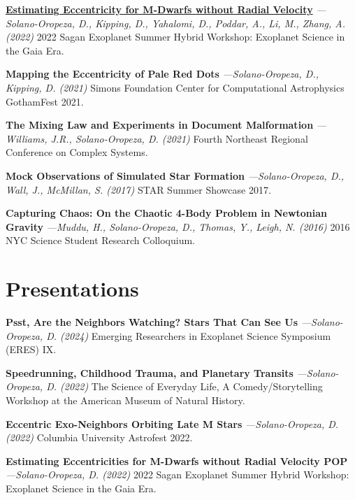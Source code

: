 \documentclass[a4paper,11pt]{article}
\begin{document}
    {\href{https://nexsci.caltech.edu/workshop/2022/posters/finalmaybe_sagan22_eccentricity_poster.pdf}{\textbf{Estimating Eccentricity for M-Dwarfs without Radial Velocity}}} \textit{—Solano-Oropeza, D., Kipping, D., Yahalomi, D., Poddar, A., Li, M., Zhang, A. (2022)} 2022 Sagan Exoplanet Summer Hybrid Workshop: Exoplanet Science in the Gaia Era.
    \vspace{1.5mm}
    
    \textbf{Mapping the Eccentricity of Pale Red Dots} \textit{—Solano-Oropeza, D., Kipping, D. (2021)} Simons Foundation Center for Computational Astrophysics GothamFest 2021.
    \vspace{1.5mm}
    
    \textbf{The Mixing Law and Experiments in Document Malformation} \textit{—Williams, J.R., Solano-Oropeza, D. (2021)} Fourth Northeast Regional Conference on Complex Systems.
    \vspace{1.5mm}
    
    \textbf{Mock Observations of Simulated Star Formation} \textit{—Solano-Oropeza, D., Wall, J., McMillan, S. (2017)} STAR Summer Showcase 2017.
    \vspace{1.5mm}
    
    \textbf{Capturing Chaos: On the Chaotic 4-Body Problem in Newtonian Gravity} \textit{—Muddu, H., Solano-Oropeza, D., Thomas, Y., Leigh, N. (2016)} 2016 NYC Science Student Research Colloquium.
    
\section{Presentations}

    \textbf{Psst, Are the Neighbors Watching? Stars That Can See Us} \textit{—Solano-Oropeza, D. (2024)} Emerging Researchers in Exoplanet Science Symposium (ERES) IX.
    \vspace{1.5mm}
    
    \textbf{Speedrunning, Childhood Trauma, and Planetary Transits} \textit{—Solano-Oropeza, D. (2022)} The Science of Everyday Life, A Comedy/Storytelling Workshop at the American Museum of Natural History.
    \vspace{1.5mm}

    \textbf{Eccentric Exo-Neighbors Orbiting Late M Stars} \textit{—Solano-Oropeza, D. (2022)} Columbia University Astrofest 2022.
    \vspace{1.5mm}
    
    \textbf{Estimating Eccentricities for M-Dwarfs without Radial Velocity POP} \textit{—Solano-Oropeza, D. (2022)} 2022 Sagan Exoplanet Summer Hybrid Workshop: Exoplanet Science in the Gaia Era.
    \vspace{1.5mm}
\end{document}

